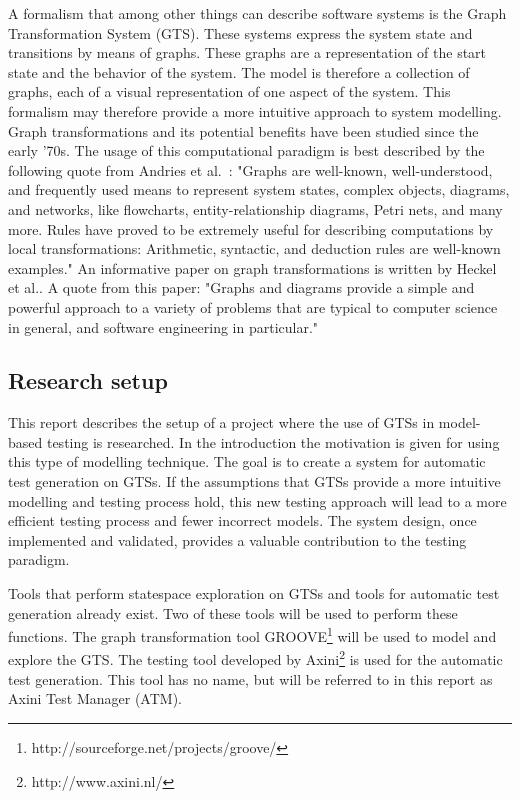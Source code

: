 A formalism that among other things can describe software systems is the Graph Transformation System (GTS). These systems express the system state and transitions by means of graphs. These graphs are a representation of the start state and the behavior of the system. The model is therefore a collection of graphs, each of a visual representation of one aspect of the system. This formalism may therefore provide a more intuitive approach to system modelling. Graph transformations and its potential benefits have been studied since the early '70s. The usage of this computational paradigm is best described by the following quote from Andries et al.~\cite{Andries1999}: "Graphs are well-known, well-understood, and frequently used means to represent system states, complex objects, diagrams, and networks, like flowcharts, entity-relationship diagrams, Petri nets, and many more. Rules have proved to be extremely useful for describing computations by local transformations: Arithmetic, syntactic, and deduction rules are well-known examples." An informative paper on graph transformations is written by Heckel et al.\cite{Heckel2006187}. A quote from this paper: "Graphs and diagrams provide a simple and powerful approach to a variety of problems that are typical to computer science in general, and software engineering in particular."

\subsection{Research setup}
This report describes the setup of a project where the use of GTSs in model-based testing is researched. In the introduction the motivation is given for using this type of modelling technique. The goal is to create a system for automatic test generation on GTSs. If the assumptions that GTSs provide a more intuitive modelling and testing process hold, this new testing approach will lead to a more efficient testing process and fewer incorrect models. The system design, once implemented and validated, provides a valuable contribution to the testing paradigm.

Tools that perform statespace exploration on GTSs and tools for automatic test generation already exist. Two of these tools will be used to perform these functions. The graph transformation tool GROOVE\footnote{http://sourceforge.net/projects/groove/} will be used to model and explore the GTS. The testing tool developed by Axini\footnote{http://www.axini.nl/} is used for the automatic test generation. This tool has no name, but will be referred to in this report as Axini Test Manager (ATM).

